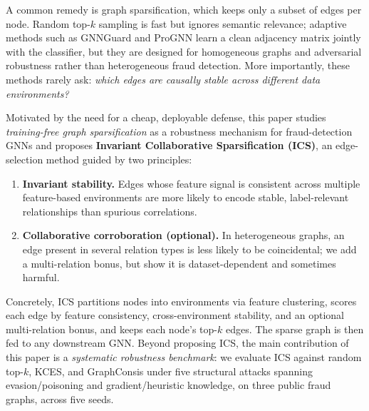 \documentclass[11pt]{article}
\begin{document}
A common remedy is graph sparsification, which keeps only a subset of edges per node. Random top-$k$ sampling is fast but ignores semantic relevance; adaptive methods such as GNNGuard \cite{zhang2020gnnguard} and ProGNN \cite{jin2020prognn} learn a clean adjacency matrix jointly with the classifier, but they are designed for homogeneous graphs and adversarial robustness rather than heterogeneous fraud detection. More importantly, these methods rarely ask: \emph{which edges are causally stable across different data environments?}

Motivated by the need for a cheap, deployable defense, this paper studies \emph{training-free graph sparsification} as a robustness mechanism for fraud-detection GNNs and proposes \textbf{Invariant Collaborative Sparsification (ICS)}, an edge-selection method guided by two principles:
\begin{enumerate}
    \item \textbf{Invariant stability.} Edges whose feature signal is consistent across multiple feature-based environments are more likely to encode stable, label-relevant relationships than spurious correlations.
    \item \textbf{Collaborative corroboration (optional).} In heterogeneous graphs, an edge present in several relation types is less likely to be coincidental; we add a multi-relation bonus, but show it is dataset-dependent and sometimes harmful.
\end{enumerate}

Concretely, ICS partitions nodes into environments via feature clustering, scores each edge by feature consistency, cross-environment stability, and an optional multi-relation bonus, and keeps each node's top-$k$ edges. The sparse graph is then fed to any downstream GNN. Beyond proposing ICS, the main contribution of this paper is a \emph{systematic robustness benchmark}: we evaluate ICS against random top-$k$, KCES, and GraphConsis under five structural attacks spanning evasion/poisoning and gradient/heuristic knowledge, on three public fraud graphs, across five seeds.
\end{document}
